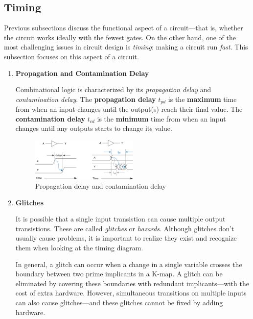 \documentclass[12pt]{article}
\begin{document}
\subsection{Timing}

Previous subsections discuss the functional aspect of a circuit---that is, whether the circuit works ideally with the fewest gates. On the other hand, one of the most challenging issues in circuit design is \textit{timing}: making a circuit run \textit{fast}. This subsection focuses on this aspect of a circuit.

\begin{enumerate}
  \item \textbf{Propagation and Contamination Delay}

  Combinational logic is characterized by its \textit{propagation delay} and \textit{contamination delay}. The \textbf{propagation delay} $t_{pd}$ is the \textbf{maximum} time from when an input changes until the output(s) reach their final value. The \textbf{contamination delay} $t_{cd}$ is the \textbf{minimum} time from when an input changes until any outputs starts to change its value.

  \begin{figure}[ht]
    \centering
    \includegraphics[width=0.5\textwidth]{propagation_contamination_delay.png}
    \caption{Propagation delay and contamination delay}
    \label{figure:8}
  \end{figure}

  \item \textbf{Glitches}

  It is possible that a single input transistion can cause multiple output transistions. These are called \textit{glitches} or \textit{hazards}. Although glitches don't usually cause problems, it is important to realize they exist and recognize them when looking at the timing diagram.

  In general, a glitch can occur when a change in a single variable crosses the boundary between two prime implicants in a K-map. A glitch can be eliminated by covering these boundaries with redundant implicants---with the cost of extra hardware. However, simultaneous transitions on multiple inputs can also cause glitches---and these glitches cannot be fixed by adding hardware.
\end{enumerate}
\end{document}
